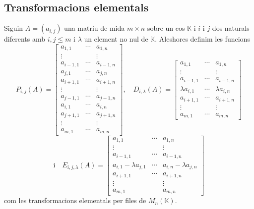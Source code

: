\documentclass[../Apunts.tex]{subfiles}
\begin{document}
	\subsection{Transformacions elementals}
	\begin{definition} %
		\label{def:transformacions elementals}
		Siguin \(A=(a_{i,j})\) una matriu de mida \(m\times n\) sobre un cos \(\mathbb{K}\) i \(i\) i \(j\) dos naturals diferents amb \(i,j\leq m\) i \(\lambda\) un element no nul de \(\mathbb{K}\). Aleshores definim les funcions
		\[P_{i,j}(A)=\left[\begin{matrix}
		a_{1,1} & \cdots & a_{1,n} \\
		\vdots & & \vdots \\
		a_{i-1,1} & \cdots & a_{i-1,n} \\
		a_{j,1} & \cdots & a_{j,n} \\
		a_{i+1,1} & \cdots & a_{i+1,n} \\
		\vdots & & \vdots \\
		a_{j-1,1} & \cdots & a_{j-1,n} \\
		a_{i,1} & \cdots & a_{i,n} \\
		a_{j+1,1} & \cdots & a_{j+1,n} \\
		\vdots & & \vdots \\
		a_{m,1} & \cdots & a_{m,n}
		\end{matrix}\right],\quad D_{i,\lambda}(A)=\left[\begin{matrix}
		a_{1,1} & \cdots & a_{1,n} \\
		\vdots & & \vdots \\
		a_{i-1,1} & \cdots & a_{i-1,n} \\
		\lambda a_{i,1} & \cdots & \lambda a_{i,n} \\
		a_{i+1,1} & \cdots & a_{i+1,n} \\
		\vdots & & \vdots \\
		a_{m,1} & \cdots & a_{m,n}
		\end{matrix}\right]\]
		\[\text{i}\quad E_{i,j,\lambda}(A)=\left[\begin{matrix}
		a_{1,1} & \cdots & a_{1,n} \\
		\vdots & & \vdots \\
		a_{i-1,1} & \cdots & a_{i-1,n} \\
		a_{i,1}-\lambda a_{j,1} & \cdots & a_{i,n}-\lambda a_{j,n}\\
		a_{i+1,1} & \cdots & a_{i+1,n} \\
		\vdots & & \vdots \\
		a_{m,1} & & a_{m,n}
		\end{matrix}\right]\]
		com les transformacions elementals per files de \(M_{n}(\mathbb{K})\).
	\end{definition}
\end{document}

